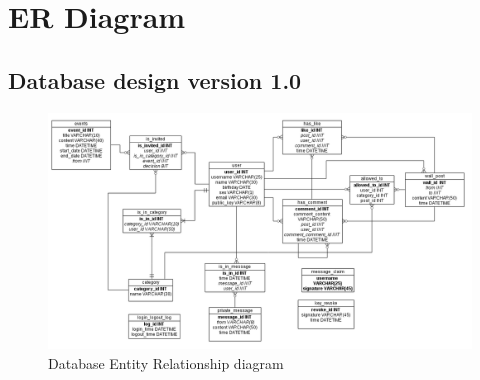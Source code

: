 \section{ER Diagram}

\subsection{Database design version 1.0}
\begin{landscape}
\begin{figure}[h]
    \includegraphics[width=1.4\textwidth]{images/design/project_er_diagram.png}
    \caption{Database Entity Relationship diagram}
    \label{fig:db_er_diag}
\end{figure}
\end{landscape}
